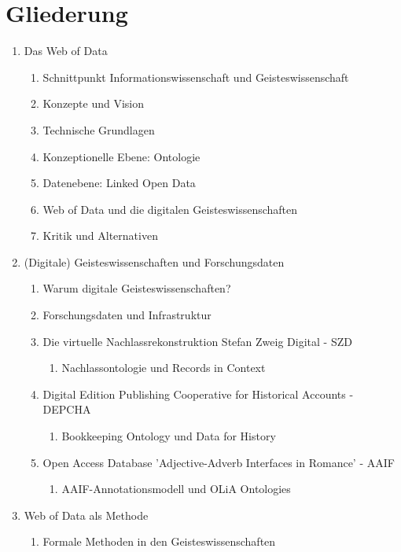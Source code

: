 \documentclass[12pt,a4paper]{article}
\begin{document}
\section{Gliederung}
\begin{enumerate}
 \item Das Web of Data 
   \begin{enumerate}
   \item  Schnittpunkt Informationswissenschaft und Geisteswissenschaft
    \item Konzepte und Vision
    \item Technische Grundlagen
    \item Konzeptionelle Ebene: Ontologie
    \item Datenebene: Linked Open Data
    \item Web of Data und die digitalen Geisteswissenschaften
    \item Kritik und Alternativen
  \end{enumerate}
\item (Digitale) Geisteswissenschaften und Forschungsdaten
\begin{enumerate}
	\item Warum digitale Geisteswissenschaften?
	\item Forschungsdaten und Infrastruktur
    \item Die virtuelle Nachlassrekonstruktion Stefan Zweig Digital - SZD 
    \begin{enumerate}
    	\item Nachlassontologie und Records in Context
     \end{enumerate}
    \item Digital Edition Publishing Cooperative for Historical Accounts - DEPCHA
    \begin{enumerate}
    	\item Bookkeeping Ontology und Data for History
     \end{enumerate}
    \item Open Access Database 'Adjective-Adverb Interfaces in Romance' - AAIF
    \begin{enumerate}
    	\item AAIF-Annotationsmodell und OLiA Ontologies
     \end{enumerate}
  \end{enumerate}
  \item Web of Data als Methode
  \begin{enumerate}
    \item Formale Methoden in den Geisteswissenschaften

\end{enumerate}
\end{enumerate}
\end{document}
